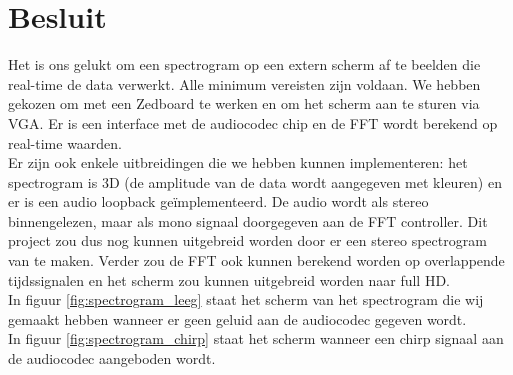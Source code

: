 \documentclass[a4paper,kul]{kulakarticle} %
\begin{document}
\section{Besluit}

Het is ons gelukt om een spectrogram op een extern scherm af te beelden die real-time de data verwerkt. Alle minimum vereisten zijn voldaan. We hebben gekozen om met een Zedboard te werken en om het scherm aan te sturen via VGA. Er is een interface met de audiocodec chip en de FFT wordt berekend op real-time waarden.\\

Er zijn ook enkele uitbreidingen die we hebben kunnen implementeren: het spectrogram is 3D (de amplitude van de data wordt aangegeven met kleuren) en er is een audio loopback geïmplementeerd. De audio wordt als stereo binnengelezen, maar als mono signaal doorgegeven aan de FFT controller. Dit project zou dus nog kunnen uitgebreid worden door er een stereo spectrogram van te maken. Verder zou de FFT ook kunnen berekend worden op overlappende tijdssignalen en het scherm zou kunnen uitgebreid worden naar full HD.\\

In figuur \ref{fig:spectrogram_leeg} staat het scherm van het spectrogram die wij gemaakt hebben wanneer er geen geluid aan de audiocodec gegeven wordt. \\
In figuur \ref{fig:spectrogram_chirp} staat het scherm wanneer een chirp signaal aan de audiocodec aangeboden wordt.
\end{document}
